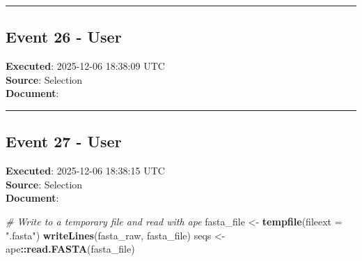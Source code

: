 \documentclass[
  11pt,
]{article}
\newenvironment{Shaded}{\begin{snugshade}}{\end{snugshade}}
\newcommand{\AttributeTok}[1]{\textcolor[rgb]{0.13,0.29,0.53}{#1}}
\newcommand{\CommentTok}[1]{\textcolor[rgb]{0.56,0.35,0.01}{\textit{#1}}}
\newcommand{\ControlFlowTok}[1]{\textcolor[rgb]{0.13,0.29,0.53}{\textbf{#1}}}
\newcommand{\DecValTok}[1]{\textcolor[rgb]{0.00,0.00,0.81}{#1}}
\newcommand{\FunctionTok}[1]{\textcolor[rgb]{0.13,0.29,0.53}{\textbf{#1}}}
\newcommand{\NormalTok}[1]{#1}
\newcommand{\OtherTok}[1]{\textcolor[rgb]{0.56,0.35,0.01}{#1}}
\newcommand{\SpecialCharTok}[1]{\textcolor[rgb]{0.81,0.36,0.00}{\textbf{#1}}}
\newcommand{\StringTok}[1]{\textcolor[rgb]{0.31,0.60,0.02}{#1}}
\begin{document}
\begin{Shaded}
\end{Shaded}

\begin{center}\rule{0.5\linewidth}{0.5pt}\end{center}

\subsection{Event 26 - User}\label{event-26---user}

\textbf{Executed}: 2025-12-06 18:38:09 UTC\\
\textbf{Source}: Selection\\
\textbf{Document}:

\begin{Shaded}
\end{Shaded}

\begin{center}\rule{0.5\linewidth}{0.5pt}\end{center}

\subsection{Event 27 - User}\label{event-27---user}

\textbf{Executed}: 2025-12-06 18:38:15 UTC\\
\textbf{Source}: Selection\\
\textbf{Document}:

\begin{Shaded}
\begin{Highlighting}[]
\CommentTok{\# Write to a temporary file and read with ape}
\NormalTok{fasta\_file }\OtherTok{\textless{}{-}} \FunctionTok{tempfile}\NormalTok{(}\AttributeTok{fileext =} \StringTok{".fasta"}\NormalTok{)}
\FunctionTok{writeLines}\NormalTok{(fasta\_raw, fasta\_file)}
\NormalTok{seqs }\OtherTok{\textless{}{-}}\NormalTok{ ape}\SpecialCharTok{::}\FunctionTok{read.FASTA}\NormalTok{(fasta\_file)}
\end{Highlighting}
\end{Shaded}
\end{document}

